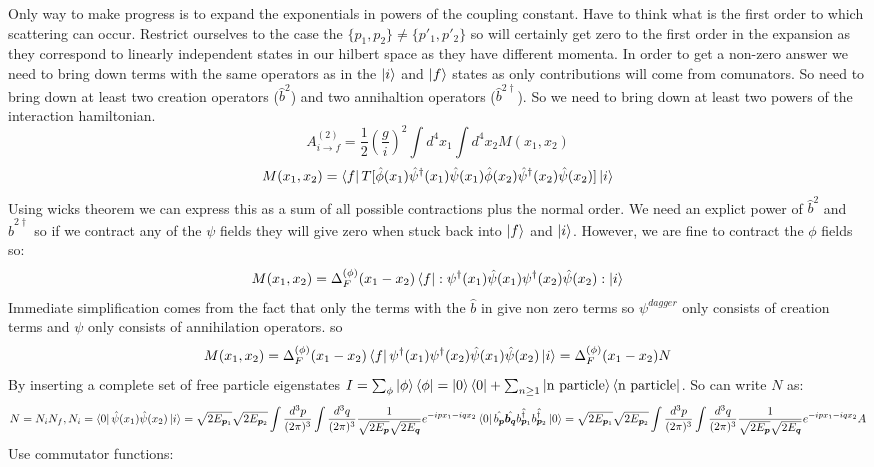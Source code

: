 \documentclass[12pt, a4paper, twoside, titlepage]{article}
\begin{document}
Only way to make progress is to expand the exponentials in powers of the coupling constant. Have to think what is the first order to which scattering can occur. Restrict ourselves to the case the $\{p_1, p_2\} \neq \{p'_1, p'_2\}$ so will certainly get zero to the first order in the expansion as they correspond to linearly independent states in our hilbert space as they have different momenta. In order to get a non-zero answer we need to bring down terms with the same operators as in the $\ket{i}$ and $\ket{f}$ states as only contributions will come from comunators. So need to bring down at least two creation operators ($\hat b^2$) and two annihaltion operators ($\hat b^{2\dagger}$). So we need to bring down at least two powers of the interaction hamiltonian. 
$$
A^{(2)}_{i \rightarrow f} = \frac{1}{2} (\frac{g}{i})^2 \int d^4 x_1 \int d^4 x_2 M(x_1, x_2)
$$
$$
M(x_1, x_2) = \bra{f} T[ \hat \phi(x_1) \hat \psi^{\dagger}(x_1) \hat \psi(x_1)\hat \phi(x_2) \hat \psi^{\dagger}(x_2) \hat \psi(x_2)] \ket{i}
$$
Using wicks theorem we can express this as a sum of all possible contractions plus the normal order. We need an explict power of $\hat b^2$ and $\hat b^{2\dagger}$ so if we contract any of the $\psi$ fields they will give zero when stuck back into $\ket{f}$ and $\ket{i}$. However, we are fine to contract the $\phi$ fields so:
$$
M(x_1, x_2) = \Delta_F^{(\phi)} (x_1-x_2) \bra{f} : \psi^{\dagger}(x_1) \hat \psi(x_1) \psi^{\dagger}(x_2) \hat \psi(x_2) : \ket{i}
$$
Immediate simplification comes from the fact that only the terms with the $\hat b$ in give non zero terms so $\psi^{dagger}$ only consists of creation terms and $\psi$ only consists of annihilation operators. so 
$$
M(x_1, x_2) = \Delta_F^{(\phi)} (x_1-x_2) \bra{f} \psi^{\dagger}(x_1) \psi^{\dagger}(x_2) \hat \psi(x_1) \hat \psi(x_2)  \ket{i} = \Delta_F^{(\phi)} (x_1-x_2)N 
$$
By inserting a complete set of free particle eigenstates $I = \sum_{\phi} \ket{\phi} \bra{\phi} = \ket{0} \bra{0} + \sum_{n \geq 1} \ket{\text{n particle}}\bra{\text{n particle}}$. So can write $N$ as:
$$
N = N_i N_f, N_i = \bra{0} \hat \psi(x_1) \hat \psi(x_2) \ket{i} = \sqrt{2 E_{\bm p_1}} \sqrt{2 E_{\bm p_2}} \int \frac{d^3 p}{(2 \pi)^3} \int \frac{d^3 q}{(2\pi)^3} \frac{1}{\sqrt{2 E_{\bm p}} \sqrt{2 E_{\bm q}}} e^{-ipx_1 - i q x_2} \bra{0} \hat{b_{\bm p}} \hat{\bm b_{\bm q}} \hat{b_{\bm p_1}^{\dagger}} \hat{ b_{\bm p_2}^{\dagger}} \ket{0} = \sqrt{2 E_{\bm p_1}} \sqrt{2 E_{\bm p_2}} \int \frac{d^3 p}{(2 \pi)^3} \int \frac{d^3 q}{(2\pi)^3} \frac{1}{\sqrt{2 E_{\bm p}} \sqrt{2 E_{\bm q}}} e^{-ipx_1 - i q x_2} A$$
Use commutator functions:
\end{document}

